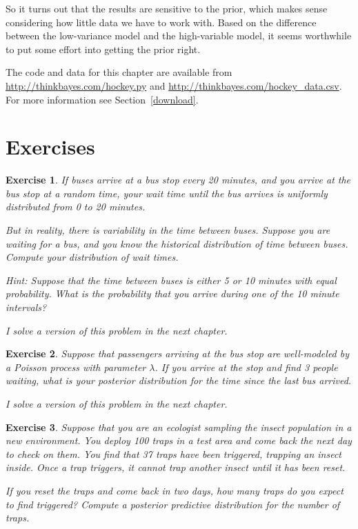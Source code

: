 \documentclass[12pt]{book}
\theoremstyle{exercise}
\newtheorem{exercise}{Exercise}[chapter]
\begin{document}
So it turns out that the results are sensitive to the prior, which
makes sense considering how little data we have to work with.  Based
on the difference between the low-variance model and the high-variable
model, it seems worthwhile to put some effort into getting the prior
right.

The code and data for this chapter are available from
\url{http://thinkbayes.com/hockey.py} and
\url{http://thinkbayes.com/hockey_data.csv}.
  For more information
see Section~\ref{download}.

\section{Exercises}

\begin{exercise}

If buses arrive at a bus stop every 20 minutes, and you
arrive at the bus stop at a random time, your wait time until
the bus arrives is uniformly distributed from 0 to 20 minutes.

But in reality, there is variability in the time between
buses.  Suppose you are waiting for a bus, and you know the historical
distribution of time between buses.  Compute your distribution
of wait times.

Hint: Suppose that the time between buses is either
5 or 10 minutes with equal probability.  What is the probability
that you arrive during one of the 10 minute intervals?

I solve a version of this problem in the next chapter.

\end{exercise}


\begin{exercise}

Suppose that passengers arriving at the bus stop are well-modeled
by a Poisson process with parameter $\lambda$.  If you arrive at the
stop and find 3 people waiting, what is your posterior distribution
for the time since the last bus arrived.

I solve a version of this problem in the next chapter.

\end{exercise}


\begin{exercise}

Suppose that you are an ecologist sampling the insect population in
a new environment.  You deploy 100 traps in a test area and come back
the next day to check on them.  You find that 37 traps have been
triggered, trapping an insect inside.  Once a trap triggers, it
cannot trap another insect until it has been reset.

If you reset the traps and come back in two days, how many traps
do you expect to find triggered?  Compute a posterior predictive
distribution for the number of traps.

\end{exercise}
\end{document}
